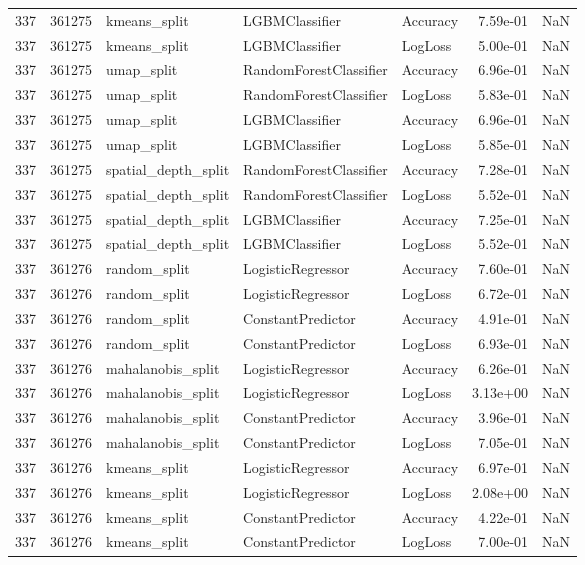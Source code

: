 \begin{tabular}{rrlllrr}
337 & 361275 & kmeans\_split & LGBMClassifier & Accuracy & 7.59e-01 & NaN \\
337 & 361275 & kmeans\_split & LGBMClassifier & LogLoss & 5.00e-01 & NaN \\
337 & 361275 & umap\_split & RandomForestClassifier & Accuracy & 6.96e-01 & NaN \\
337 & 361275 & umap\_split & RandomForestClassifier & LogLoss & 5.83e-01 & NaN \\
337 & 361275 & umap\_split & LGBMClassifier & Accuracy & 6.96e-01 & NaN \\
337 & 361275 & umap\_split & LGBMClassifier & LogLoss & 5.85e-01 & NaN \\
337 & 361275 & spatial\_depth\_split & RandomForestClassifier & Accuracy & 7.28e-01 & NaN \\
337 & 361275 & spatial\_depth\_split & RandomForestClassifier & LogLoss & 5.52e-01 & NaN \\
337 & 361275 & spatial\_depth\_split & LGBMClassifier & Accuracy & 7.25e-01 & NaN \\
337 & 361275 & spatial\_depth\_split & LGBMClassifier & LogLoss & 5.52e-01 & NaN \\
337 & 361276 & random\_split & LogisticRegressor & Accuracy & 7.60e-01 & NaN \\
337 & 361276 & random\_split & LogisticRegressor & LogLoss & 6.72e-01 & NaN \\
337 & 361276 & random\_split & ConstantPredictor & Accuracy & 4.91e-01 & NaN \\
337 & 361276 & random\_split & ConstantPredictor & LogLoss & 6.93e-01 & NaN \\
337 & 361276 & mahalanobis\_split & LogisticRegressor & Accuracy & 6.26e-01 & NaN \\
337 & 361276 & mahalanobis\_split & LogisticRegressor & LogLoss & 3.13e+00 & NaN \\
337 & 361276 & mahalanobis\_split & ConstantPredictor & Accuracy & 3.96e-01 & NaN \\
337 & 361276 & mahalanobis\_split & ConstantPredictor & LogLoss & 7.05e-01 & NaN \\
337 & 361276 & kmeans\_split & LogisticRegressor & Accuracy & 6.97e-01 & NaN \\
337 & 361276 & kmeans\_split & LogisticRegressor & LogLoss & 2.08e+00 & NaN \\
337 & 361276 & kmeans\_split & ConstantPredictor & Accuracy & 4.22e-01 & NaN \\
337 & 361276 & kmeans\_split & ConstantPredictor & LogLoss & 7.00e-01 & NaN \\

\end{tabular}
